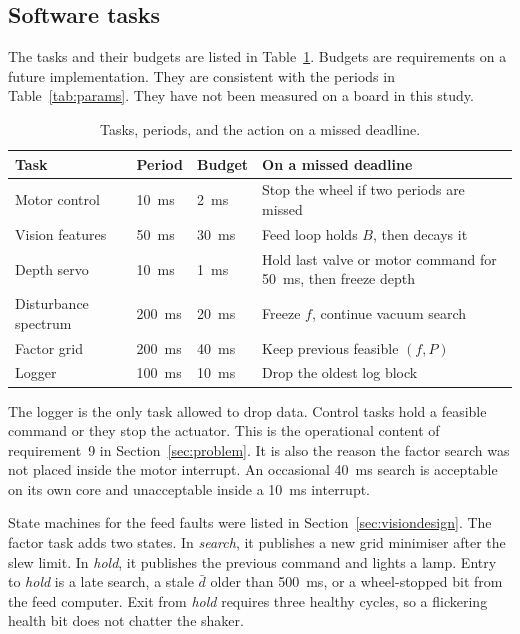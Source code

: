 \subsection{Software tasks}

The tasks and their budgets are listed in Table~\ref{tab:tasks}. Budgets are requirements on a future implementation. They are consistent with the periods in Table~\ref{tab:params}. They have not been measured on a board in this study.

\begin{table}[htbp]
\centering
\caption{Tasks, periods, and the action on a missed deadline.}
\label{tab:tasks}
\begin{tabular}{@{}p{38mm}p{18mm}p{28mm}p{58mm}@{}}
\toprule
Task & Period & Budget & On a missed deadline \\
\midrule
Motor control & 10~ms & 2~ms & Stop the wheel if two periods are missed \\
Vision features & 50~ms & 30~ms & Feed loop holds $B$, then decays it \\
Depth servo & 10~ms & 1~ms & Hold last valve or motor command for 50~ms, then freeze depth \\
Disturbance spectrum & 200~ms & 20~ms & Freeze $f$, continue vacuum search \\
Factor grid & 200~ms & 40~ms & Keep previous feasible $(f,P)$ \\
Logger & 100~ms & 10~ms & Drop the oldest log block \\
\bottomrule
\end{tabular}
\end{table}

The logger is the only task allowed to drop data. Control tasks hold a feasible command or they stop the actuator. This is the operational content of requirement~9 in Section~\ref{sec:problem}. It is also the reason the factor search was not placed inside the motor interrupt. An occasional 40~ms search is acceptable on its own core and unacceptable inside a 10~ms interrupt.

State machines for the feed faults were listed in Section~\ref{sec:visiondesign}. The factor task adds two states. In \emph{search}, it publishes a new grid minimiser after the slew limit. In \emph{hold}, it publishes the previous command and lights a lamp. Entry to \emph{hold} is a late search, a stale $\bar d$ older than 500~ms, or a wheel-stopped bit from the feed computer. Exit from \emph{hold} requires three healthy cycles, so a flickering health bit does not chatter the shaker.

